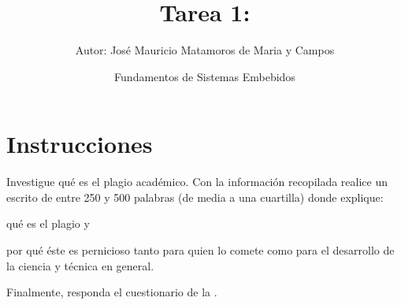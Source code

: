 \documentclass[letterpaper,10.5pt]{article}
\author{\footnotesize Autor: José Mauricio Matamoros de Maria y Campos}
\title{Tarea 1:}
\date{Fundamentos de Sistemas Embebidos}
\begin{document}
\maketitle
\thispagestyle{empty}


\section{Instrucciones}%
\label{sec:instructions}
Investigue qué es el plagio académico.
Con la información recopilada realice un escrito de entre 250 y 500 palabras (de media a una cuartilla) donde explique:
\begin{enumerate*}[nosep,label=\roman*\(\rpar{}\)]
	\item qué es el plagio
	y
	\item por qué éste es pernicioso tanto para quien lo comete como para el desarrollo de la ciencia y técnica en general.
\end{enumerate*}
Finalmente, responda el cuestionario de la .
\end{document}
